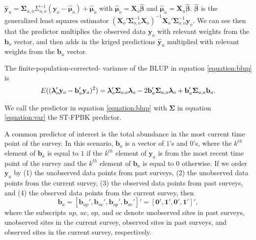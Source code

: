 \documentclass[]{article}    %
\begin{document}
\(\mathbf{\hat{y}}_{u} = \bm{\Sigma}_{u, o} \Sigma_{o, o}^{-1} (\mathbf{y}_o - \bm{\hat{\mu}}_o) + \bm{\hat{\mu}}_u\)
with \(\bm{\hat{\mu}}_o = \mathbf{X}_o \bm{\hat{\beta}}\) and
\(\bm{\hat{\mu}}_u = \mathbf{X}_u \bm{\hat{\beta}}\).
\(\bm{\hat{\beta}}\) is the generalized least squares estimator
\((\mathbf{X}_o' \bm{\Sigma}_{o, o}^{-1} \mathbf{X}_o)^{-1} \mathbf{X}_o' \bm{\Sigma}_{o, o}^{-1} \mathbf{y}_o\).
We can see then that the predictor multiplies the observed data
\(\mathbf{y}_o\) with relevant weights from the \(\mathbf{b}_o\) vector,
and then adds in the kriged predictions \(\mathbf{\hat{y}}_{u}\)
multiplied with relevant weights from the \(\mathbf{b}_u\) vector.

The finite-population-corrected- variance of the BLUP in equation
\ref{equation:blup} is \mbox{} \begin{equation} \label{equation:predvar}
E((\bm{\lambda}_o'\mathbf{y}_o - \mathbf{b}_a'\mathbf{y}_a)^2) = \\
\bm{\lambda}_o'\bm{\Sigma}_{o, o}\bm{\lambda}_o - 2 \mathbf{b}_a' \bm{\Sigma}_{a, o} \bm{\lambda}_o + \mathbf{b}_a' \bm{\Sigma}_{a, a} \mathbf{b}_a.
\end{equation}

\noindent We call the predictor in equation \ref{equation:blup} with
\(\bm{\Sigma}\) in equation \ref{equation:var} the ST-FPBK predictor.

A common predictor of interest is the total abundance in the most
current time point of the survey. In this scenario, \(\mathbf{b}_a\) is
a vector of \(1\)'s and \(0\)'s, where the \(k^{th}\) element of
\(\mathbf{b}_a\) is equal to \(1\) if the \(k^{th}\) element of
\(\mathbf{y}_a\) is from the most recent time point of the survey and
the \(k^{th}\) element of \(\mathbf{b}_a\) is equal to 0 otherwise. If
we order \(\mathbf{y}_a\) by (1) the unobserved data points from past
surveys, (2) the unobserved data points from the current survey, (3) the
observed data points from past surveys, and (4) the observed data points
from the current survey, then \mbox{}
\begin{equation} \label{equation:currentweights}
\mathbf{b}_a = [\mathbf{b}_{up}', \mathbf{b}_{uc}', \mathbf{b}_{op}', \mathbf{b}_{oc}']' = [\mathbf{0}', \mathbf{1}', \mathbf{0}', \mathbf{1}']',
\end{equation} \noindent where the subscripts \(up\), \(uc\), \(op\),
and \(oc\) denote unobserved sites in past surveys, unobserved sites in
the current survey, observed sites in past surveys, and observed sites
in the current survey, respectively.
\end{document}
